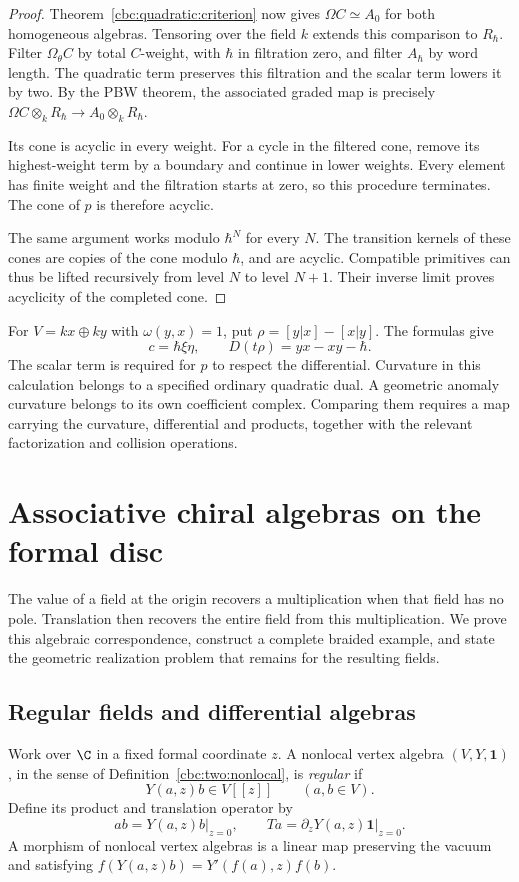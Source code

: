 \begin{proof}
Theorem~\ref{cbc:quadratic:criterion} now gives
$\Omega C\simeq A_0$ for both homogeneous algebras.
Tensoring over the field $k$ extends this comparison to $R_\hbar$.
Filter $\Omega_\theta C$ by total $C$-weight, with $\hbar$ in filtration zero, and filter $A_\hbar$ by word length.
The quadratic term preserves this filtration and the scalar term lowers it by two.
By the PBW theorem, the associated graded map is precisely
$\Omega C\otimes_k R_\hbar\to A_0\otimes_k R_\hbar$.

Its cone is acyclic in every weight.
For a cycle in the filtered cone, remove its highest-weight term by a boundary and continue in lower weights.
Every element has finite weight and the filtration starts at zero, so this procedure terminates.
The cone of $p$ is therefore acyclic.

The same argument works modulo $\hbar^N$ for every $N$.
The transition kernels of these cones are copies of the cone modulo $\hbar$, and are acyclic.
Compatible primitives can thus be lifted recursively from level $N$ to level $N+1$.
Their inverse limit proves acyclicity of the completed cone.
\end{proof}

For $V=kx\oplus ky$ with $\omega(y,x)=1$, put
$\rho=[y|x]-[x|y]$.
The formulas give
\[
 c=\hbar\xi\eta,\qquad D(t\rho)=yx-xy-\hbar.
\]
The scalar term is required for $p$ to respect the differential.
Curvature in this calculation belongs to a specified ordinary quadratic dual.
A geometric anomaly curvature belongs to its own coefficient complex.
Comparing them requires a map carrying the curvature, differential and products, together with the relevant factorization and collision operations.

\chapter{Associative chiral algebras on the formal disc}\label{cbc:disc:chapter}

The value of a field at the origin recovers a multiplication when that field has no pole.
Translation then recovers the entire field from this multiplication.
We prove this algebraic correspondence, construct a complete braided example, and state the geometric realization problem that remains for the resulting fields.

\section{Regular fields and differential algebras}
Work over $\C$ in a fixed formal coordinate $z$.
A nonlocal vertex algebra $(V,Y,\mathbf1)$, in the sense of Definition~\ref{cbc:two:nonlocal}, is \emph{regular} if
\[
 Y(a,z)b\in V[[z]]\qquad(a,b\in V).
\]
Define its product and translation operator by
\[
 ab=Y(a,z)b\big|_{z=0},\qquad
 Ta=\partial_zY(a,z)\mathbf1\big|_{z=0}.
\]
A morphism of nonlocal vertex algebras is a linear map preserving the vacuum and satisfying
$f(Y(a,z)b)=Y'(f(a),z)f(b)$.

